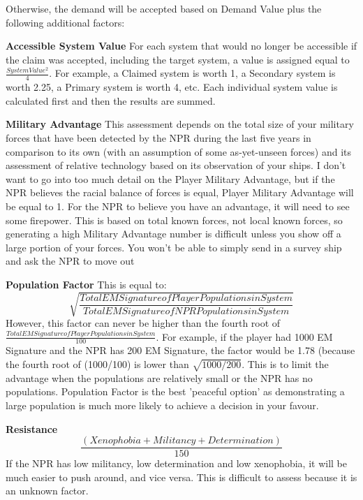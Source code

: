 \documentclass[../Aurora C# unofficial manual.tex]{subfiles}
\begin{document}
	Otherwise, the demand will be accepted based on Demand Value plus the following additional factors:
	
	\textbf{Accessible System Value}\newline
	For each system that would no longer be accessible if the claim was accepted, including the target system, a value is assigned equal to \( \frac{System Value^{2}}{4} \). For example, a Claimed system is worth 1, a Secondary system is worth 2.25, a Primary system is worth 4, etc. Each individual system value is calculated first and then the results are summed.
	
	\textbf{Military Advantage}\newline
	This assessment depends on the total size of your military forces that have been detected by the NPR during the last five years in comparison to its own (with an assumption of some as-yet-unseen forces) and its assessment of relative technology based on its observation of your ships. I don't want to go into too much detail on the Player Military Advantage, but if the NPR believes the racial balance of forces is equal, Player Military Advantage will be equal to 1. For the NPR to believe you have an advantage, it will need to see some firepower. This is based on total known forces, not local known forces, so generating a high Military Advantage number is difficult unless you show off a large portion of your forces. You won't be able to simply send in a survey ship and ask the NPR to move out
	
	\textbf{Population Factor}\newline
	This is equal to:
	\[ \sqrt{\frac{Total EM Signature of Player Populations in System}{Total EM Signature of NPR Populations in System}} \]
	However, this factor can never be higher than the fourth root of \( \frac{Total EM Signature of Player Populations in System}{100} \). For example, if the player had 1000 EM Signature and the NPR has 200 EM Signature, the factor would be 1.78 (because the fourth root of (1000/100) is lower than \( \sqrt{1000 / 200} \). This is to limit the advantage when the populations are relatively small or the NPR has no populations. Population Factor is the best ’peaceful option’ as demonstrating a large population is much more likely to achieve a decision in your favour.
	
	\textbf{Resistance}\newline
	\[ \frac{(Xenophobia + Militancy + Determination)}{150} \]
	If the NPR has low militancy, low determination and low xenophobia, it will be much easier to push around, and vice versa. This is difficult to assess because it is an unknown factor.
	
\end{document}
